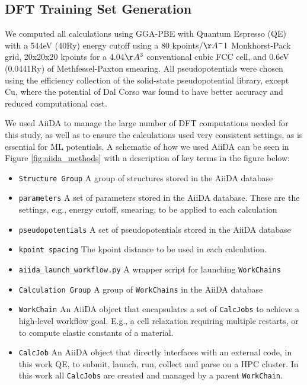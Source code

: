 \documentclass{article}
\begin{document}
\subsection{DFT Training Set Generation}
We computed all calculations using GGA-PBE\cite{Perdew1996} with Quantum Espresso\cite{Giannozzi2009} (QE) with a
544eV (40Ry) energy cutoff 
using a 80 kpoints/$\AA^-1$ Monkhorst-Pack grid\cite{Pack1977SpecialIntegrations},
20x20x20 kpoints for a 4.04$\AA^3$ conventional cubic FCC cell,
and 0.6eV (0.0441Ry) of Methfessel-Paxton smearing\cite{Methfessel1989High-precisionMetals}.
All pseudopotentials were chosen using the efficiency collection of the solid-state pseudopotential library\cite{Prandini2018}, except Cu, where the potential of Dal Corso\cite{DalCorso2014}
was found to have better accuracy and reduced computational cost.

We used AiiDA\cite{Pizzi2016, Huber2020AiiDAProvenance} to manage the large number of DFT computations needed for this study, as well as to ensure the calculations used very consistent settings, as is essential for ML potentials\cite{Dragoni2018AchievingIron}.
A schematic of how we used AiiDA can be seen in Figure \ref{fig:aiida_methods} with a description of key terms in the figure below:
\begin{itemize}
    \item \texttt{Structure Group}  A group of structures stored in the AiiDA database
    \item \texttt{parameters}  A set of parameters stored in the AiiDA database. These are the settings, e.g., energy cutoff, smearing, to be applied to each calculation
    \item \texttt{pseudopotentials}  A set of pseudopotentials stored in the AiiDA database 
    \item \texttt{kpoint spacing}  The kpoint distance to be used in each calculation. 
    \item \texttt{aiida_launch_workflow.py}  A wrapper script for launching \texttt{WorkChains} 
    \item \texttt{Calculation Group}  A group of \texttt{WorkChains} in the AiiDA database 
    \item \texttt{WorkChain}  An AiiDA object that encapsulates a set of \texttt{CalcJobs} to 
                                          achieve a high-level workflow goal. E.g., a cell relaxation requiring 
                                          multiple restarts, or to compute elastic constants of a material. 
    \item \texttt{CalcJob}    An AiiDA object that directly interfaces with an external code, 
                                          in this work QE, to submit, launch, run, collect and parse on a HPC 
                                          cluster. In this work all \texttt{CalcJobs} are created and
                                          managed by a parent \texttt{WorkChain}.
    
\end{itemize}
\end{document}

